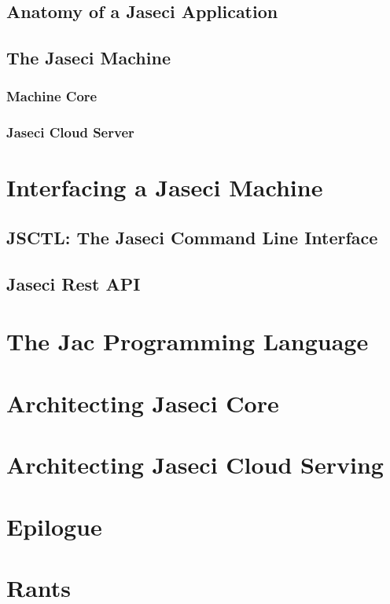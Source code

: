 \documentclass{book}
\begin{document}
\section{Anatomy of a Jaseci Application}
\section{The Jaseci Machine}
\subsection{Machine Core}
\subsection{Jaseci Cloud Server}

\chapter{Interfacing a Jaseci Machine}
\section{JSCTL: The Jaseci Command Line Interface}
\section{Jaseci Rest API}

\chapter{The Jac Programming Language}


\chapter{Architecting Jaseci Core}

\chapter{Architecting Jaseci Cloud Serving}

\chapter*{Epilogue}

\appendix
\chapter{Rants}
\end{document}
